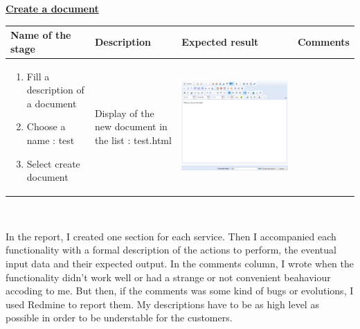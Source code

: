 \textbf{\underline {Create a document}} \\
\newline
\begin{tabular}{|m{3.7cm}|m{2.3cm}|m{4cm}|m{2.1cm}|}
\hline
\textbf{Name of the stage} & \textbf{Description}
 & \textbf{Expected result} & \textbf{Comments} \\
\hline
\begin{enumerate}
	\item Fill a description of a document

	\item Choose a name : test

	\item Select create document 
\end{enumerate}&
Display of the new document in the list : test.html & 
\begin{minipage}{0.7\textwidth}
\includegraphics[scale=0.15]{Images/document.png} 
\end{minipage}& 
\\
\hline
\end{tabular}
\\
\newline

In the report, I created one section for each service. Then I accompanied 
each functionality with a formal description of the actions to perform, 
the eventual input data and their expected output. In the comments column, I wrote when the
functionality didn't work well or had a strange or not convenient beahaviour accoding to me. But then, 
if the comments was some kind of bugs or evolutions, I used Redmine to report them.  
My descriptions have to be as high level as possible in order to be understable for the customers. 

